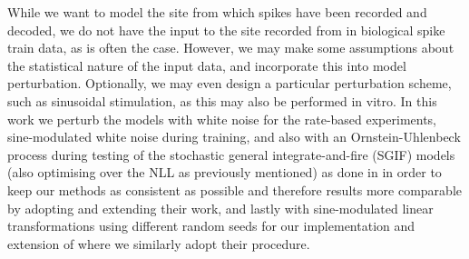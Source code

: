 \documentclass[mphil,deptreport,ianc]{infthesis} %
\begin{document}
While we want to model the site from which spikes have been recorded and decoded, we do not have the input to the site recorded from in biological spike train data, as is often the case.
However, we may make some assumptions about the statistical nature of the input data, and incorporate this into model perturbation. Optionally, we may even design a particular perturbation scheme, such as sinusoidal stimulation, as this may also be performed in vitro.
In this work we perturb the models with white noise for the rate-based experiments, sine-modulated white noise during training, and also with an Ornstein-Uhlenbeck process during testing of the stochastic general integrate-and-fire (SGIF) models (also optimising over the NLL as previously mentioned) as done in \cite{Rene2020} in order to keep our methods as consistent as possible and therefore results more comparable by adopting and extending their work, and lastly with sine-modulated linear transformations using different random seeds for our implementation and extension of \cite{Huh2018} where we similarly adopt their procedure.





\end{document}
